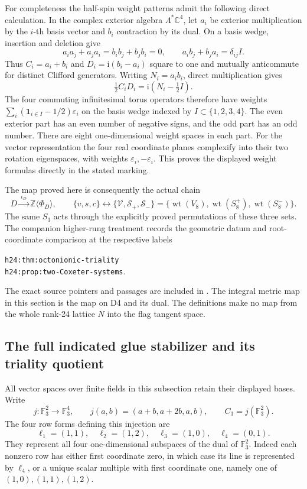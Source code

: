 For completeness the half-spin weight patterns admit the following
direct calculation.  In the complex exterior algebra
\(\Lambda^*\mathbb C^4\), let \(a_i\) be exterior multiplication
by the \(i\)-th basis vector and \(b_i\) contraction by its dual.
On a basis wedge, insertion and deletion give
\[
 a_ia_j+a_ja_i=b_ib_j+b_jb_i=0,\qquad
 a_ib_j+b_ja_i=\delta_{ij}I.
\]
Thus \(C_i=a_i+b_i\) and \(D_i=\mathrm i(b_i-a_i)\) square to
one and mutually anticommute for distinct Clifford generators.
Writing \(N_i=a_ib_i\), direct multiplication gives
\[
 \tfrac12 C_iD_i=\mathrm i(N_i-\tfrac12 I).
\]
The four commuting infinitesimal torus operators therefore have weights
\(\sum_i(\mathbf1_{i\in I}-1/2)\varepsilon_i\) on the basis
wedge indexed by \(I\subset\{1,2,3,4\}\).  The even exterior
part has an even number of negative signs, and the odd part has an odd
number.  There are eight one-dimensional weight spaces in each part.
For the vector representation the four real coordinate planes
complexify into their two rotation eigenspaces, with weights
\(\varepsilon_i,-\varepsilon_i\).  This proves the displayed
weight formulas directly in the stated marking.

The map proved here is consequently the actual chain
\[
 D\xrightarrow{\ \iota_D\ }\mathbb Z\langle\Phi_D\rangle,
 \qquad
 \{v,s,c\}\longleftrightarrow
       \{\mathcal V,\mathcal S_+,\mathcal S_-\}
       =\{\operatorname{wt}(V_8),
          \operatorname{wt}(S_8^+),\operatorname{wt}(S_8^-)\}.
\]
The same \(S_3\) acts through the explicitly proved permutations of
these three sets.  The companion higher-rung treatment records the
geometric datum and root-coordinate comparison at the respective labels
\begin{center}
\texttt{h24:thm:octonionic-triality}\\
\texttt{h24:prop:two-Coxeter-systems}.
\end{center}
The exact source pointers and passages are included in
\cite{esn:Provenance}.  The integral metric map
in this section is the map on D4 and its dual.  The definitions make no
map from the whole rank-24 lattice \(N\) into the flag tangent space.

\subsection{The full indicated glue stabilizer and its triality quotient}
\label{esn:subsec:glue-gl2-triality}

All vector spaces over finite fields in this subsection retain their displayed
bases.  Write
\[
 j:\mathbb F_3^2\longrightarrow\mathbb F_3^4,
 \qquad j(a,b)=(a+b,a+2b,a,b),
 \qquad C_3=j(\mathbb F_3^2).
\]
The four row forms defining this injection are
\[
 \ell_1=(1,1),\quad \ell_2=(1,2),\quad
 \ell_3=(1,0),\quad \ell_4=(0,1).
\]
They represent all four one-dimensional subspaces of the dual of
\(\mathbb F_3^2\).  Indeed each nonzero row has either first coordinate zero,
in which case its line is represented by \(\ell_4\), or a unique scalar
multiple with first coordinate one, namely one of
\((1,0),(1,1),(1,2)\).

